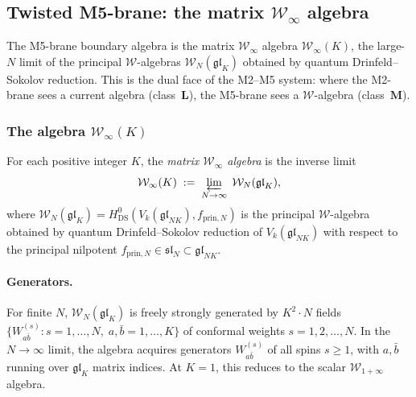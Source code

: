 \subsection{Twisted M5-brane: the matrix \texorpdfstring{$\mathcal{W}_\infty$}{W-infinity} algebra}
\label{subsec:twisted-M5-primitive}

The M5-brane boundary algebra is the matrix $\mathcal{W}_\infty$
algebra $\mathcal{W}_\infty(K)$, the large-$N$ limit of the
principal $\mathcal{W}$-algebras $\mathcal{W}_N(\mathfrak{gl}_K)$
obtained by quantum Drinfeld--Sokolov reduction. This is the
dual face of the M2--M5 system: where the M2-brane sees a
current algebra (class~$\mathbf{L}$), the M5-brane sees a
$\mathcal{W}$-algebra (class~$\mathbf{M}$).

\subsubsection{The algebra \texorpdfstring{$\mathcal{W}_\infty(K)$}{W-infinity(K)}}

\begin{definition}
\label{def:W-infinity-K}
For each positive integer $K$, the \emph{matrix $\mathcal{W}_\infty$ algebra}
is the inverse limit
\[
\mathcal{W}_\infty(K)
\;:=\;
\varprojlim_{N \to \infty}\;
\mathcal{W}_N(\mathfrak{gl}_K),
\]
where $\mathcal{W}_N(\mathfrak{gl}_K) = H^0_{\mathrm{DS}}(V_k(\mathfrak{gl}_{NK}),
f_{\mathrm{prin},N})$ is the principal $\mathcal{W}$-algebra obtained
by quantum Drinfeld--Sokolov reduction of $V_k(\mathfrak{gl}_{NK})$
with respect to the principal nilpotent
$f_{\mathrm{prin},N} \in \mathfrak{sl}_N \subset \mathfrak{gl}_{NK}$.
\end{definition}

\paragraph{Generators.}
For finite $N$, $\mathcal{W}_N(\mathfrak{gl}_K)$ is freely strongly
generated by $K^2 \cdot N$ fields
$\{W^{(s)}_{a\bar b} : s = 1, \ldots, N,\; a,\bar b = 1, \ldots, K\}$
of conformal weights $s = 1, 2, \ldots, N$. In the $N \to \infty$ limit,
the algebra acquires generators $W^{(s)}_{a\bar b}$ of all spins
$s \ge 1$, with $a, \bar b$ running over $\mathfrak{gl}_K$ matrix indices.
At $K = 1$, this reduces to the scalar $\mathcal{W}_{1+\infty}$ algebra.

